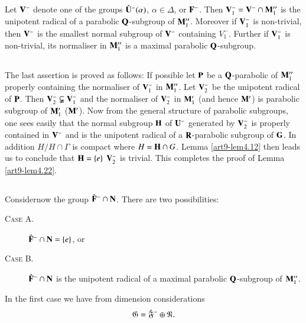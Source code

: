 \setcounter{definition}{21}
\begin{lemma}\label{art9-lem4.22}
Let $\mathbf{V}^-$ denote one of the groups $\hat{\mathbf{U}}^-(\alpha)$, $\alpha \in \Delta$, or $\mathbf{F}^-$. Then $\mathbf{V}^-_1 = \mathbf{V}^- \cap \mathbf{M}''_1$ is the unipotent radical of a parabolic $\mathbf{Q}$-subgroup of $\mathbf{M}''_1$. Moreover if $\mathbf{V}^-_1$ is non-trivial, then $\mathbf{V}^-$ is the smallest normal subgroup of $\mathbf{V}^-$ containing $V^-_1$. Further if $\mathbf{V}^-_1$ is non-trivial, its normaliser in $\mathbf{M}''_1$ is a maximal parabolic $\mathbf{Q}$-subgroup.
\end{lemma}

\setcounter{subsection}{22}
\subsection{}\label{art9-subsec4.23}
The last assertion is proved as follows: If possible let $\mathbf{P}$ be a $\mathbf{Q}$-parabolic of $\mathbf{M}''_1$ properly containing the normaliser of $\mathbf{V}^-_1$ in $\mathbf{M}''_1$. Let $\mathbf{V}^-_2$ be the unipotent radical of $\mathbf{P}$. Then $\mathbf{V}^-_2 \varsubsetneqq \mathbf{V}^-_1$ and the normaliser of $\mathbf{V}^-_2$ in $\mathbf{M}'_1$  (and hence $\mathbf{M}'$) is parabolic subgroup of $\mathbf{M}'_1$ (\resp $\mathbf{M}'$). Now from the general structure of parabolic subgroups, one sees easily that the normal subgroup $\mathbf{H}$ of $\mathbf{U}^-$ generated by $\mathbf{V}^-_2$ is properly contained in $\mathbf{V}^-$ and is the unipotent radical of a $\mathbf{R}$-parabolic subgroup of $\mathbf{G}$. In addition $H/H \cap \Gamma$ is compact where $H = \mathbf{H} \cap G$. Lemma \ref{art9-lem4.12} then leads us to conclude that $\mathbf{H} = \{e\}$ \ie $\mathbf{V}^-_2$ is trivial. This completes the proof of Lemma \ref{art9-lem4.22}.

\subsection{}\label{art9-subsec4.24}
Consider\pageoriginale now the group $\hat{\mathbf{F}}^- \cap \mathbf{N}$. There are two possibilities: 
\begin{description}
\item[\textsc{Case A.}] $\hat{\mathbf{F}}^- \cap \mathbf{N} = \{e\}$, or 

\item[\textsc{Case B.}] $\hat{\mathbf{F}}^- \cap \mathbf{N}$ is the unipotent radical of a maximal parabolic $\mathbf{Q}$-subgroup of $\mathbf{M}''_1$.
\end{description}

In the first case we have from dimension considerations
$$
\mathfrak{G} = \hat{\mathfrak{F}}^- \oplus \mathfrak{N}.
$$

